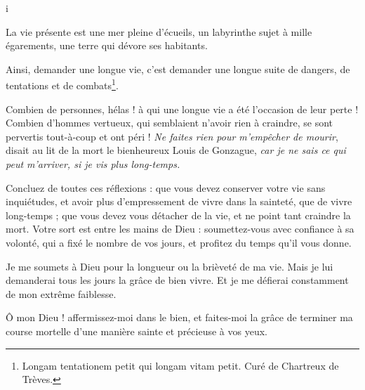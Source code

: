 i\documentclass[instructions.tex]{subfiles}
\begin{document}
La vie présente est une mer pleine d'écueils, un labyrinthe sujet à mille égarements, une terre qui dévore ses habitants.

Ainsi, demander une longue vie, c'est demander une longue suite de dangers, de tentations et de combats\footnote{Longam tentationem petit qui longam vitam petit. Curé de Chartreux de Trèves.}.

Combien de personnes, hélas ! à qui une longue vie a été l'occasion de leur perte ! Combien d'hommes vertueux, qui semblaient n'avoir rien à craindre, se sont pervertis tout-à-coup et ont péri ! \emph{Ne faites rien pour m'empêcher de mourir}, disait au lit de la mort le bienheureux Louis de Gonzague, \emph{car je ne sais ce qui peut m'arriver, si je vis plus long-temps.}

Concluez de toutes ces réflexions : que vous devez conserver votre vie sans inquiétudes, et avoir plus d'empressement de vivre dans la sainteté, que de vivre long-temps ; que vous devez vous détacher de la vie, et ne point tant craindre la mort. Votre sort est entre les mains de Dieu : soumettez-vous avec confiance à sa volonté, qui a fixé le nombre de vos jours, et profitez du temps qu'il vous donne.

Je me soumets à Dieu pour la longueur ou la brièveté de ma vie. Mais je lui demanderai tous les jours la grâce de bien vivre. Et je me défierai constamment de mon extrême faiblesse.

Ô mon Dieu ! affermissez-moi dans le bien, et faites-moi la grâce de terminer ma course mortelle d'une manière sainte et précieuse à vos yeux.
\end{document}
